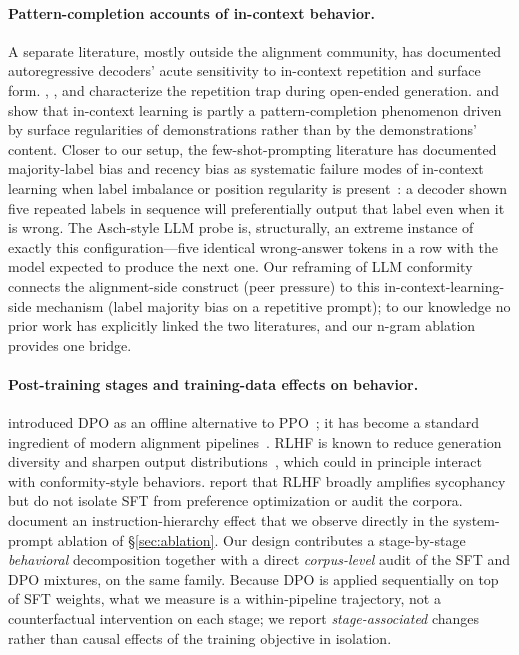 \documentclass[11pt]{article}
\begin{document}
\paragraph{Pattern-completion accounts of in-context behavior.}
A separate literature, mostly outside the alignment community, has documented autoregressive decoders' acute sensitivity to in-context repetition and surface form. \citet{holtzman2020curious}, \citet{welleck2020unlikelihood}, and \citet{fu2021theoretical} characterize the repetition trap during open-ended generation. \citet{min2022rethinking} and \citet{shi2023large} show that in-context learning is partly a pattern-completion phenomenon driven by surface regularities of demonstrations rather than by the demonstrations' content. Closer to our setup, the few-shot-prompting literature has documented majority-label bias and recency bias as systematic failure modes of in-context learning when label imbalance or position regularity is present~\citep{zhao2021calibrate, lu2022fantastically}: a decoder shown five repeated labels in sequence will preferentially output that label even when it is wrong. The Asch-style LLM probe is, structurally, an extreme instance of exactly this configuration---five identical wrong-answer tokens in a row with the model expected to produce the next one. Our reframing of LLM conformity connects the alignment-side construct (peer pressure) to this in-context-learning-side mechanism (label majority bias on a repetitive prompt); to our knowledge no prior work has explicitly linked the two literatures, and our n-gram ablation provides one bridge.

\paragraph{Post-training stages and training-data effects on behavior.}
\citet{rafailov2023dpo} introduced DPO as an offline alternative to PPO~\citep{schulman2017ppo}; it has become a standard ingredient of modern alignment pipelines~\citep{olmo3, meta2024llama3, meta2025llama4}. RLHF is known to reduce generation diversity and sharpen output distributions~\citep{rlhf_entropy}, which could in principle interact with conformity-style behaviors. \citet{sharma2024sycophancy} report that RLHF broadly amplifies sycophancy but do not isolate SFT from preference optimization or audit the corpora. \citet{wallace2024instruction} document an instruction-hierarchy effect that we observe directly in the system-prompt ablation of \S\ref{sec:ablation}. Our design contributes a stage-by-stage \emph{behavioral} decomposition together with a direct \emph{corpus-level} audit of the SFT and DPO mixtures, on the same family. Because DPO is applied sequentially on top of SFT weights, what we measure is a within-pipeline trajectory, not a counterfactual intervention on each stage; we report \emph{stage-associated} changes rather than causal effects of the training objective in isolation.
\end{document}

